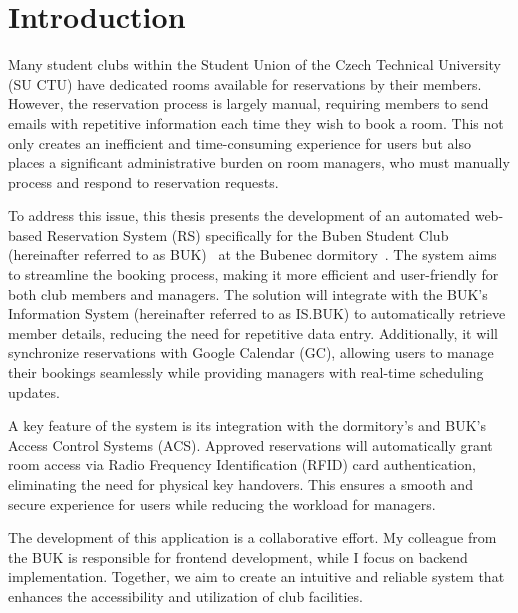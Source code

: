 \chapter*{Introduction}
\setcounter{page}{1}

Many student clubs within the Student Union of the Czech Technical University (SU CTU) have dedicated rooms available for reservations by their members. However, the reservation process is largely manual, requiring members to send emails with repetitive information each time they wish to book a room. This not only creates an inefficient and time-consuming experience for users but also places a significant administrative burden on room managers, who must manually process and respond to reservation requests.

To address this issue, this thesis presents the development of an automated web-based Reservation System (RS) specifically for the Buben Student Club (hereinafter referred to as BUK)~\cite{BUKWiki} at the Bubenec dormitory~\cite{SUZBubenec}. The system aims to streamline the booking process, making it more efficient and user-friendly for both club members and managers. The solution will integrate with the BUK’s Information System (hereinafter referred to as IS.BUK) to automatically retrieve member details, reducing the need for repetitive data entry. Additionally, it will synchronize reservations with Google Calendar (GC), allowing users to manage their bookings seamlessly while providing managers with real-time scheduling updates.

A key feature of the system is its integration with the dormitory’s and BUK’s Access Control Systems (ACS). Approved reservations will automatically grant room access via Radio Frequency Identification (RFID) card authentication, eliminating the need for physical key handovers. This ensures a smooth and secure experience for users while reducing the workload for managers.

The development of this application is a collaborative effort. My colleague from the BUK is responsible for frontend development, while I focus on backend implementation. Together, we aim to create an intuitive and reliable system that enhances the accessibility and utilization of club facilities.

